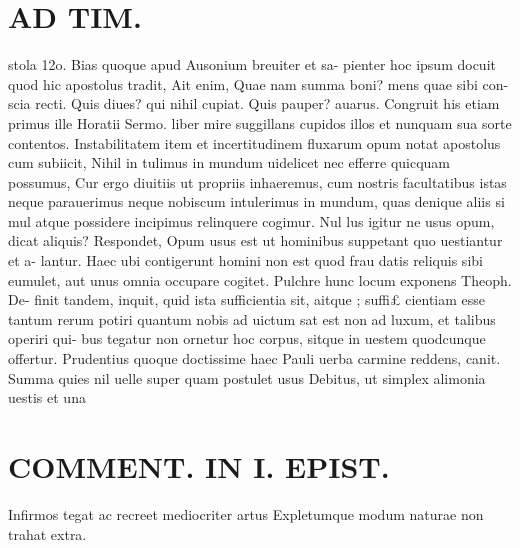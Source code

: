 \documentclass{article}
\begin{document}
\begin{pages}
\section*{AD TIM. }
\marginpar{[ p.168 ]}\pstart stola 12o. Bias quoque apud Ausonium breuiter et sa- pienter hoc ipsum docuit quod hic apostolus tradit, Ait enim, Quae nam summa boni? mens quae sibi con- scia recti. Quis diues? qui nihil cupiat. Quis pauper? auarus. Congruit his etiam primus ille Horatii Sermo. liber mire suggillans cupidos illos et nunquam sua sorte contentos. Instabilitatem item et incertitudinem fluxarum opum notat apostolus cum subiicit, Nihil in tulimus in mundum uidelicet nec efferre quicquam possumus, Cur ergo diuitiis ut propriis inhaeremus, cum nostris facultatibus istas neque parauerimus neque  nobiscum intulerimus in mundum, quas denique aliis si mul atque possidere incipimus relinquere cogimur. Nul lus igitur ne usus opum, dicat aliquis? Respondet, Opum usus est ut hominibus suppetant quo uestiantur et a- lantur. Haec ubi contigerunt homini non est quod frau datis reliquis sibi eumulet, aut unus omnia occupare cogitet. Pulchre hunc locum exponens Theoph. De- finit tandem, inquit, quid ista sufficientia sit, aitque ; suffi£ cientiam esse tantum rerum potiri quantum nobis ad uictum sat est non ad luxum, et talibus operiri qui- bus tegatur non ornetur hoc corpus, sitque in uestem quodcunque offertur. Prudentius quoque doctissime haec Pauli uerba carmine reddens, canit.  \pend\pstart Summa quies nil uelle super quam postulet usus Debitus, ut simplex alimonia uestis et una  \pend
\section*{COMMENT. IN I. EPIST. }\pstart Infirmos tegat ac recreet mediocriter artus Expletumque modum naturae non trahat extra.  \pend
{}
{}

\end{pages}
\end{document}
